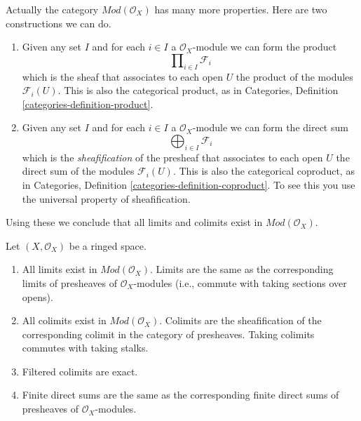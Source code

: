 \noindent
Actually the category $\textit{Mod}(\mathcal{O}_X)$ has many more properties.
Here are two constructions we can do.
\begin{enumerate}
\item Given any set $I$ and for each $i \in I$ a $\mathcal{O}_X$-module
we can form the product
$$
\prod\nolimits_{i \in I} \mathcal{F}_i
$$
which is the sheaf that associates to each open $U$ the
product of the modules $\mathcal{F}_i(U)$. This is also the
categorical product, as in
Categories, Definition \ref{categories-definition-product}.
\item Given any set $I$ and for each $i \in I$ a $\mathcal{O}_X$-module
we can form the direct sum
$$
\bigoplus\nolimits_{i \in I} \mathcal{F}_i
$$
which is the {\it sheafification} of the presheaf
that associates to each open $U$ the
direct sum of the modules $\mathcal{F}_i(U)$.
This is also the categorical coproduct, as in
Categories, Definition \ref{categories-definition-coproduct}.
To see this you use the universal property of sheafification.
\end{enumerate}
Using these we conclude that all limits and colimits exist in
$\textit{Mod}(\mathcal{O}_X)$.

\begin{lemma}
\label{lemma-limits-colimits}
Let $(X, \mathcal{O}_X)$ be a ringed space.
\begin{enumerate}
\item All limits exist in $\textit{Mod}(\mathcal{O}_X)$.
Limits are the same as the corresponding limits of presheaves of
$\mathcal{O}_X$-modules (i.e., commute with taking
sections over opens).
\item All colimits exist in $\textit{Mod}(\mathcal{O}_X)$.
Colimits are the sheafification of the corresponding colimit in
the category of presheaves. Taking colimits commutes with taking
stalks.
\item Filtered colimits are exact.
\item Finite direct sums are the same as the corresponding
finite direct sums of presheaves of $\mathcal{O}_X$-modules.
\end{enumerate}
\end{lemma}

